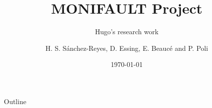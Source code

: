 \documentclass[aspectratio=43,9pt]{beamer}
\title{MONIFAULT Project}								%
\subtitle{Hugo's research work}
\date{\today}
\author{H. S. S\'anchez-Reyes, D. Essing, E. Beauc\'e and P. Poli}								%
\institute{ISTerre, Universit\'e Grenoble Alpes}							%
\begin{document}
\maketitle


\begin{frame}{Outline}
\small \tableofcontents[hideallsubsections] 
\end{frame}
\end{document}
